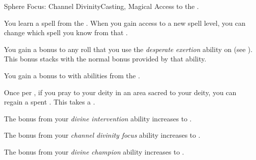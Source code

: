    \begin{feat}{Sphere Focus: Channel Divinity}{Casting, Magical}
        \featpre Access to the  .

         You learn a spell from the  .
        When you gain access to a new spell level, you can change which spell you know from that .

         You gain a  bonus to any roll that you use the \textit{desperate exertion} ability on (see ).
        This bonus stacks with the normal  bonus provided by that ability.

         You gain a  bonus to  with abilities from the  .

         Once per , if you pray to your deity in an area sacred to your deity, you can regain a spent .
        This takes a .

         The bonus from your \textit{divine intervention} ability increases to .

         The bonus from your \textit{channel divinity focus} ability increases to .

         The bonus from your \textit{divine champion} ability increases to .
    \end{feat}

